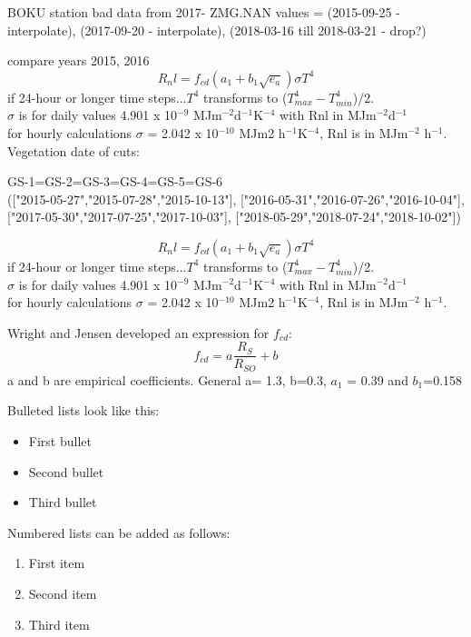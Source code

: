 \documentclass[hydrology,article,submit,moreauthors,pdftex]{Definitions/mdpi}
\begin{document}
BOKU station bad data from 2017-
ZMG.NAN values = (2015-09-25 - interpolate), (2017-09-20 - interpolate), (2018-03-16 till 2018-03-21 - drop?)

compare years 2015, 2016
\begin{equation}
R_nl = f_{cd} (a_1+b_1\sqrt{e_a})\sigma T^4
\end{equation}
if 24-hour or longer time steps...$T^4$ transforms to ($T^4_{max}-T^4_{min}$)/2. \\
$\sigma$ is for daily values 4.901 x 10$^{-9}$ MJm$^{-2}$d$^{-1}$K$^{-4}$ with Rnl in MJm$^{-2}$d$^{-1}$ \\
for hourly calculations $\sigma$ = 2.042 x 10$^{-10}$ MJm2 h$^{-1}$K$^{-4}$, Rnl is in MJm$^{-2}$ h$^{-1}$.
\\
Vegetation
date of cuts:

GS-1=GS-2=GS-3=GS-4=GS-5=GS-6 \\
(["2015-05-27","2015-07-28","2015-10-13"],
["2016-05-31","2016-07-26","2016-10-04"],
["2017-05-30","2017-07-25","2017-10-03"],
["2018-05-29","2018-07-24","2018-10-02"])

\begin{equation}
R_nl = f_{cd} (a_1+b_1\sqrt{e_a})\sigma T^4
\end{equation}
if 24-hour or longer time steps...$T^4$ transforms to ($T^4_{max}-T^4_{min}$)/2. \\
$\sigma$ is for daily values 4.901 x 10$^{-9}$ MJm$^{-2}$d$^{-1}$K$^{-4}$ with Rnl in MJm$^{-2}$d$^{-1}$ \\
for hourly calculations $\sigma$ = 2.042 x 10$^{-10}$ MJm2 h$^{-1}$K$^{-4}$, Rnl is in MJm$^{-2}$ h$^{-1}$.

Wright and Jensen \cite{wright1972peak} developed an expression for $f_{cd}$:
\begin{equation}
f_{cd} = a \frac{R_S}{R_{SO}} + b
\end{equation}
a and b are empirical coefficients. General a= 1.3, b=0.3, $a_1$ = 0.39 and $b_1$=0.158

%
%
%
%
%
%
%
%
%
%
%
%
%

Bulleted lists look like this:
\begin{itemize}[leftmargin=*,labelsep=5.8mm]
\item	First bullet
\item	Second bullet
\item	Third bullet
\end{itemize}

Numbered lists can be added as follows:
\begin{enumerate}[leftmargin=*,labelsep=4.9mm]
\item	First item 
\item	Second item
\item	Third item
\end{enumerate}
\end{document}

